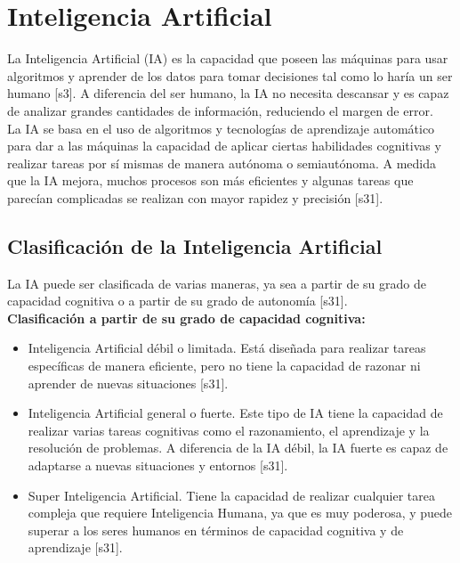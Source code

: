 \section{Inteligencia Artificial}
La Inteligencia Artificial (IA) es la capacidad que poseen las máquinas para usar algoritmos y aprender de los datos para tomar decisiones tal como lo haría un ser humano [s3]. A diferencia del ser humano, la IA no necesita descansar y es capaz de analizar grandes cantidades de información, reduciendo el margen de error.\\

La IA se basa en el uso de algoritmos y tecnologías de aprendizaje automático para dar a las máquinas la capacidad de aplicar ciertas habilidades cognitivas y realizar tareas por sí mismas de manera autónoma o semiautónoma. A medida que la IA mejora, muchos procesos son más eficientes y algunas tareas que parecían complicadas se realizan con mayor rapidez y precisión [s31].\\

\subsection{Clasificación de la Inteligencia Artificial}
La IA puede ser clasificada de varias maneras, ya sea a partir de su grado de capacidad cognitiva o a partir de su grado de autonomía [s31].\\

\textbf{Clasificación a partir de su grado de capacidad cognitiva:}
\begin{itemize}
    \item Inteligencia Artificial débil o limitada. Está diseñada para realizar tareas específicas de manera eficiente, pero no tiene la capacidad de razonar ni aprender de nuevas situaciones [s31].\\
\item Inteligencia Artificial general o fuerte. Este tipo de IA tiene la capacidad de realizar varias tareas cognitivas como el razonamiento, el aprendizaje y la resolución de problemas. A diferencia de la IA débil, la IA fuerte es capaz de adaptarse a nuevas situaciones y entornos [s31].\\
\item Super Inteligencia Artificial. Tiene la capacidad de realizar cualquier tarea compleja que requiere Inteligencia Humana, ya que es muy poderosa, y puede superar a los seres humanos en términos de capacidad cognitiva y de aprendizaje [s31].\\

\end{itemize}

